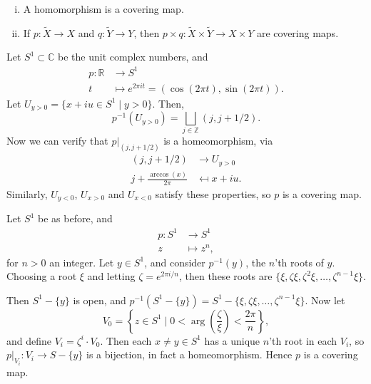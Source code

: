 \documentclass[12pt]{article}
\begin{document}
\begin{exbox}
	\begin{enumerate}[(i)]
		\item A homomorphism is a covering map.
		\item If $p : \tilde X \to X$ and $q : \tilde Y \to Y$, then $p \times q : \tilde X \times \tilde Y \to X \times Y$ are covering maps.
	\end{enumerate}
\end{exbox}

\begin{exbox}
	Let $S^1 \subset \mathbb{C}$ be the unit complex numbers, and
	\begin{align*}
		p : \mathbb{R} & \to S^1 \\
		t &\mapsto e^{2\pi i t} = (\cos(2 \pi t), \sin(2 \pi t)).
	\end{align*}
	Let $U_{y > 0} = \{x + iu \in S^1 \mid y > 0\}$. Then,
	\[
	p^{-1}(U_{y > 0}) = \bigsqcup_{j \in \mathbb{Z}}(j, j + 1/2).
	\]
	Now we can verify that $p|_{(j, j+1/2)}$ is a homeomorphism, via
	\begin{align*}
		(j, j + 1/2) &\to U_{y>0} \\
		j + \frac{\arccos(x)}{2 \pi} &\mapsfrom x + iu.
	\end{align*}
	Similarly, $U_{y < 0}$, $U_{x > 0}$ and $U_{x < 0}$ satisfy these properties, so $p$ is a covering map.
\end{exbox}

\begin{exbox}
	Let $S^1$ be as before, and
	\begin{align*}
		p : S^1 &\to S^1 \\
		z &\mapsto z^n,
	\end{align*}
	for $n > 0$ an integer. Let $y \in S^1$, and consider $p^{-1}(y)$, the $n$'th roots of $y$. Choosing a root $\xi$ and letting $\zeta = e^{2 \pi i/n}$, then these roots are $\{\xi, \zeta \xi, \zeta^2 \xi, \ldots, \zeta^{n-1} \xi\}$.

	Then $S^1 - \{y\}$ is open, and $p^{-1}(S^1 - \{y\}) = S^1 - \{\xi, \zeta \xi, \ldots, \zeta^{n-1} \xi\}$. Now let
	\[
		V_0 = \left\{z \in S^1 \mid 0 < \arg \left( \frac{\zeta}{\xi} \right) < \frac{2 \pi}{n} \right\},
	\]
	and define $V_i = \zeta^i \cdot V_0$. Then each $x \neq y \in S^1$ has a unique $n$'th root in each $V_i$, so $p|_{V_i} : V_i \to S - \{y\}$ is a bijection, in fact a homeomorphism. Hence $p$ is a covering map.
\end{exbox}
\end{document}
